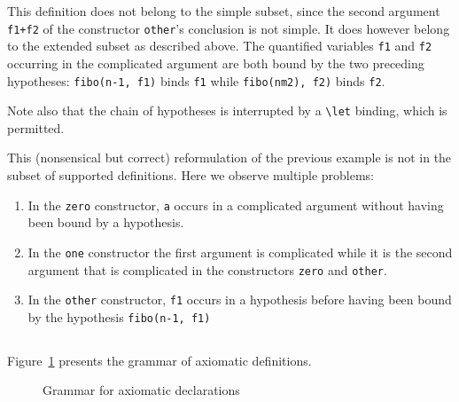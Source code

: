 \begin{example}[supported]
  This definition does not belong to the simple subset, since the second
  argument \lstinline|f1+f2| of the constructor \lstinline|other|'s conclusion
  is not simple. It does however belong to the extended subset as described
  above.
  The quantified variables \lstinline|f1| and \lstinline|f2| occurring in the
  complicated argument are both bound by the two preceding hypotheses:
  \lstinline|fibo(n-1, f1)| binds \lstinline|f1| while
  \lstinline|fibo(nm2), f2)| binds \lstinline|f2|.

  Note also that the chain of hypotheses is interrupted by a \lstinline|\let|
  binding, which is permitted.
\end{example}

\begin{example}[unsupported]
  This (nonsensical but correct) reformulation of the previous example is not in the subset
  of supported definitions.
  Here we observe multiple problems:
  \begin{enumerate}
  \item In the \lstinline|zero| constructor, \lstinline|a| occurs in a
    complicated argument without having been bound by a hypothesis.
  \item In the \lstinline|one| constructor the first argument is complicated
    while it is the second argument that is complicated in the constructors
    \lstinline|zero| and \lstinline|other|.
  \item In the \lstinline|other| constructor, \lstinline|f1| occurs in a
    hypothesis before having been bound by the hypothesis
    \lstinline|fibo(n-1, f1)|
  \end{enumerate}
\end{example}


\subsection{}
\label{sec:axiomatic}
\experimental

\nodiff

Figure~\ref{fig:gram:logicdecl} presents the grammar of axiomatic definitions.

\begin{figure}[htbp]
  \caption{Grammar for axiomatic declarations}
\label{fig:gram:logicdecl}
\end{figure}

